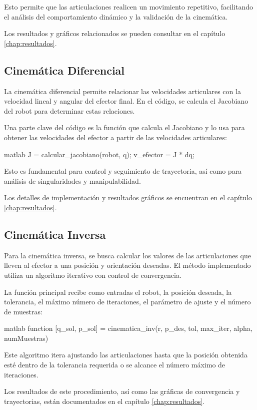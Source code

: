 Esto permite que las articulaciones realicen un movimiento repetitivo, facilitando el análisis del comportamiento dinámico y la validación de la cinemática.

Los resultados y gráficos relacionados se pueden consultar en el capítulo \autoref{chap:resultados}.

\subsection{Cinemática Diferencial}

La cinemática diferencial permite relacionar las velocidades articulares con la velocidad lineal y angular del efector final. En el código, se calcula el Jacobiano del robot para determinar estas relaciones.

Una parte clave del código es la función que calcula el Jacobiano y lo usa para obtener las velocidades del efector a partir de las velocidades articulares:

\begin{matlabcode}{matlab}
	J = calcular_jacobiano(robot, q);
	v_efector = J * dq;
\end{matlabcode}

Esto es fundamental para control y seguimiento de trayectoria, así como para análisis de singularidades y manipulabilidad.

Los detalles de implementación y resultados gráficos se encuentran en el capítulo \autoref{chap:resultados}.

\subsection{Cinemática Inversa}

Para la cinemática inversa, se busca calcular los valores de las articulaciones que lleven al efector a una posición y orientación deseadas. El método implementado utiliza un algoritmo iterativo con control de convergencia.

La función principal recibe como entradas el robot, la posición deseada, la tolerancia, el máximo número de iteraciones, el parámetro de ajuste y el número de muestras:

\begin{matlabcode}{matlab}
	function [q_sol, p_sol] = cinematica_inv(r, p_des, tol, max_iter, alpha, numMuestras)
\end{matlabcode}

Este algoritmo itera ajustando las articulaciones hasta que la posición obtenida esté dentro de la tolerancia requerida o se alcance el número máximo de iteraciones.

Los resultados de este procedimiento, así como las gráficas de convergencia y trayectorias, están documentados en el capítulo \autoref{chap:resultados}.
